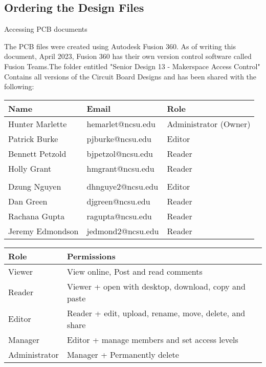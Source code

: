 \subsection{Ordering the Design Files}
\begin{subsubsec}{Accessing PCB documents}

The PCB files were created using Autodesk Fusion 360. As of writing this document, April 2023, Fusion 360 has their own version control software called Fusion Teams.The folder entitled "Senior Design 13 - Makerspace Access Control" Contains all versions of the Circuit Board Designs and has been shared with the following: 
\vspace{1em}

    \begin{center}
        \setlength{\tabcolsep}{24pt} %
        \begin{tabular}{l l l}
            Name & Email & Role\\
            \toprule
            Hunter Marlette & hemarlet@ncsu.edu & Administrator (Owner)\\
            Patrick Burke & pjburke@ncsu.edu & Editor\\
            Bennett Petzold & bjpetzol@ncsu.edu & Reader\\
            Holly Grant & hmgrant@ncsu.edu & Reader\\ 
            \\
            Dzung Nguyen & dhnguye2@ncsu.edu & Editor\\
            Dan Green & djgreen@ncsu.edu & Reader\\
            Rachana Gupta & ragupta@ncsu.edu & Reader\\
            Jeremy Edmondson & jedmond2@ncsu.edu & Reader\\      
        \end{tabular}
    \end{center}

\vspace{2em}
\vspace{1em}

    \begin{center}
        \setlength{\tabcolsep}{24pt} %
        \begin{tabular}{l l}
            Role & Permissions\\
            \toprule
            Viewer & View online, Post and read comments\\
            Reader & Viewer + open with desktop, download, copy and paste\\ 
            Editor & Reader + edit, upload, rename, move, delete, and share\\
            Manager & Editor + manage members and set access levels\\
            Administrator & Manager + Permanently delete\\
        \end{tabular}
    \end{center}
    

\end{subsubsec}
